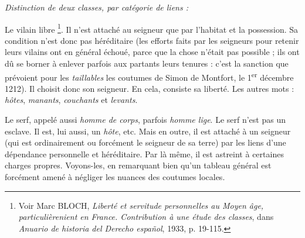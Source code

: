 \documentclass[french,twoside]{book} %
\newlength{\listmod}
\newcommand{\listhead}[1]{\hspace{-1\listmod}\emph{#1}}
\begin{document}
\begin{listalpha}[itemsep=0pt,]
\item[]\listhead{Distinction de deux classes, par catégorie de liens :}
\item Le vilain libre \footnote{ Voir Marc BLOCH, {\itshape Liberté et servitude personnelles au Moyen âge, particulièrenient en France. Contribution à une étude des classes}, dans {\itshape Anuario de historia del Derecho español}, 1933, p. 19-115.}. Il n’est attaché au seigneur que par l’habitat et la possession. Sa condition n’est donc pas héréditaire (les efforts faits par les seigneurs pour retenir leurs vilains ont en général échoué, parce que la chose n’était pas possible ; ils ont dû se borner à enlever parfois aux partants leurs tenures : c’est la sanction que prévoient pour les \emph{taillables} les coutumes de Simon de Montfort, le 1\textsuperscript{er} décembre 1212). Il choisit donc son seigneur. En cela, consiste sa liberté. Les autres mots : \emph{hôtes}, \emph{manants}, \emph{couchants} et \emph{levants}.
\item Le serf, appelé aussi \emph{homme de corps}, parfois \emph{homme lige}. Le serf n’est pas un esclave. Il est, lui aussi, un \emph{hôte}, etc. Mais en outre, il est attaché à un seigneur (qui est ordinairement ou forcément le seigneur de sa terre) par les liens d’une dépendance personnelle et héréditaire. Par là même, il est astreint à certaines charges propres. Voyons-les, en remarquant bien qu’un tableau général est forcément amené à négliger les nuances des coutumes locales.

\end{listalpha}
\end{document}
